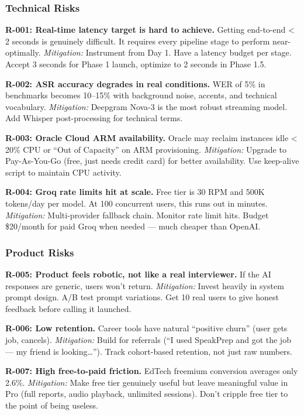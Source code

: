 \documentclass[
  11pt,
]{article}
\begin{document}
\hypertarget{technical-risks}{%
\subsubsection{Technical Risks}\label{technical-risks}}

\textbf{R-001: Real-time latency target is hard to achieve.} Getting
end-to-end \textless{} 2 seconds is genuinely difficult. It requires
every pipeline stage to perform near-optimally. \emph{Mitigation:}
Instrument from Day 1. Have a latency budget per stage. Accept 3 seconds
for Phase 1 launch, optimize to 2 seconds in Phase 1.5.

\textbf{R-002: ASR accuracy degrades in real conditions.} WER of 5\% in
benchmarks becomes 10--15\% with background noise, accents, and
technical vocabulary. \emph{Mitigation:} Deepgram Nova-3 is the most
robust streaming model. Add Whisper post-processing for technical terms.

\textbf{R-003: Oracle Cloud ARM availability.} Oracle may reclaim
instances idle \textless{} 20\% CPU or ``Out of Capacity'' on ARM
provisioning. \emph{Mitigation:} Upgrade to Pay-As-You-Go (free, just
needs credit card) for better availability. Use keep-alive script to
maintain CPU activity.

\textbf{R-004: Groq rate limits hit at scale.} Free tier is 30 RPM and
500K tokens/day per model. At 100 concurrent users, this runs out in
minutes. \emph{Mitigation:} Multi-provider fallback chain. Monitor rate
limit hits. Budget \$20/month for paid Groq when needed --- much cheaper
than OpenAI.

\hypertarget{product-risks}{%
\subsubsection{Product Risks}\label{product-risks}}

\textbf{R-005: Product feels robotic, not like a real interviewer.} If
the AI responses are generic, users won't return. \emph{Mitigation:}
Invest heavily in system prompt design. A/B test prompt variations. Get
10 real users to give honest feedback before calling it launched.

\textbf{R-006: Low retention.} Career tools have natural ``positive
churn'' (user gets job, cancels). \emph{Mitigation:} Build for referrals
(``I used SpeakPrep and got the job --- my friend is looking\ldots{}'').
Track cohort-based retention, not just raw numbers.

\textbf{R-007: High free-to-paid friction.} EdTech freemium conversion
averages only 2.6\%. \emph{Mitigation:} Make free tier genuinely useful
but leave meaningful value in Pro (full reports, audio playback,
unlimited sessions). Don't cripple free tier to the point of being
useless.
\end{document}
